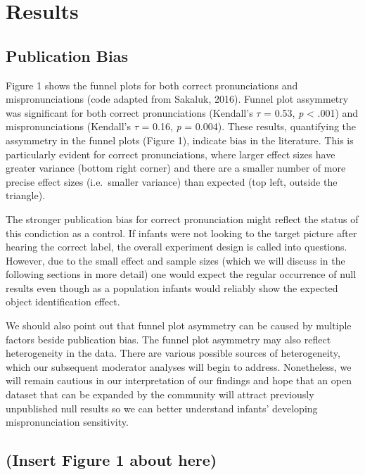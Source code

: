 \documentclass[man]{apa6}
\theoremstyle{definition}
\theoremstyle{definition}
\theoremstyle{definition}
\theoremstyle{remark}
\begin{document}
\section{Results}\label{results}

\subsection{Publication Bias}\label{publication-bias-1}

Figure 1 shows the funnel plots for both correct pronunciations and
mispronunciations (code adapted from Sakaluk, 2016). Funnel plot
assymmetry was significant for both correct pronunciations (Kendall's
\(\tau\) = 0.53, \emph{p} \textless{} .001) and mispronunciations
(Kendall's \(\tau\) = 0.16, \emph{p} = 0.004). These results,
quantifying the assymmetry in the funnel plots (Figure 1), indicate bias
in the literature. This is particularly evident for correct
pronunciations, where larger effect sizes have greater variance (bottom
right corner) and there are a smaller number of more precise effect
sizes (i.e.~smaller variance) than expected (top left, outside the
triangle).

The stronger publication bias for correct pronunciation might reflect
the status of this condiction as a control. If infants were not looking
to the target picture after hearing the correct label, the overall
experiment design is called into questions. However, due to the small
effect and sample sizes (which we will discuss in the following sections
in more detail) one would expect the regular occurrence of null results
even though as a population infants would reliably show the expected
object identification effect.

We should also point out that funnel plot asymmetry can be caused by
multiple factors beside publication bias. The funnel plot asymmetry may
also reflect heterogeneity in the data. There are various possible
sources of heterogeneity, which our subsequent moderator analyses will
begin to address. Nonetheless, we will remain cautious in our
interpretation of our findings and hope that an open dataset that can be
expanded by the community will attract previously unpublished null
results so we can better understand infants' developing mispronunciation
sensitivity.

\subsection{(Insert Figure 1 about
here)}\label{insert-figure-1-about-here}
\end{document}
